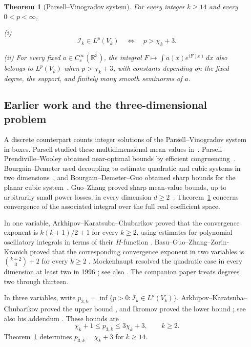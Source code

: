 \documentclass[11pt]{amsart}
\newtheorem{theorem}{Theorem}[section]
\theoremstyle{definition}
\theoremstyle{remark}
\newcommand{\R}{\mathbb R}
\numberwithin{equation}{section}
\begin{document}
\begin{theorem}[Parsell--Vinogradov system]\label{root:main}
For every integer $k\ge14$ and every $0<p<\infty$,

\noindent\textup{(i)} \[ \mathcal I_k\in L^p(V_k)\quad\Longleftrightarrow\quad p>\chi_k+3. \]

\noindent\textup{(ii)} For every fixed $a\in C_c^\infty(\R^3)$, the integral $F\mapsto\int a(x)e^{iF(x)}\,dx$ also belongs to $L^p(V_k)$ when $p>\chi_k+3$, with constants depending on the fixed degree, the support, and finitely many smooth seminorms of $a$.
\end{theorem}


\subsection{Earlier work and the three-dimensional problem}\label{intro:earlier}

A discrete counterpart counts integer solutions of the Parsell--Vinogradov system in boxes. Parsell studied these multidimensional mean values in~\cite{Parsell05}. Parsell--Prendiville--Wooley obtained near-optimal bounds by efficient congruencing~\cite{PPW13}. Bourgain--Demeter used decoupling to estimate quadratic and cubic systems in two dimensions~\cite{BD16}, and Bourgain--Demeter--Guo obtained sharp bounds for the planar cubic system~\cite{BDGuo17}. Guo--Zhang proved sharp mean-value bounds, up to arbitrarily small power losses, in every dimension $d\ge2$~\cite{GZ19}. Theorem~\ref{root:main} concerns convergence of the associated integral over the full real coefficient space.

In one variable, Arkhipov--Karatsuba--Chubarikov proved that the convergence exponent is $k(k+1)/2+1$ for every $k\ge2$, using estimates for polynomial oscillatory integrals in terms of their $H$-function \cite[Theorems 1 and 5]{AKC80}. Basu--Guo--Zhang--Zorin-Kranich proved that the corresponding convergence exponent in two variables is $\binom{k+2}{3}+2$ for every $k\ge2$ \cite[Theorem 1.2]{BGZZK}. Mockenhaupt resolved the quadratic case in every dimension at least two in 1996 \cite{Moc96}; see also \cite[Section 1.3]{BGZZK}. The companion paper \cite{PaperII} treats degrees two through thirteen.

In three variables, write $p_{3,k}=\inf\{p>0:\mathcal I_k\in L^p(V_k)\}$. Arkhipov--Karatsuba--Chubarikov proved the upper bound \cite[Theorem 7]{AKC80}, and Ikromov proved the lower bound \cite[Theorem 1]{Ikr97}; see also his addendum \cite{Ikr22}. These bounds are
\[
\chi_k+1\le p_{3,k}\le3\chi_k+3,\qquad k\ge2.
\]
Theorem~\ref{root:main} determines $p_{3,k}=\chi_k+3$ for $k\ge14$.
\end{document}
